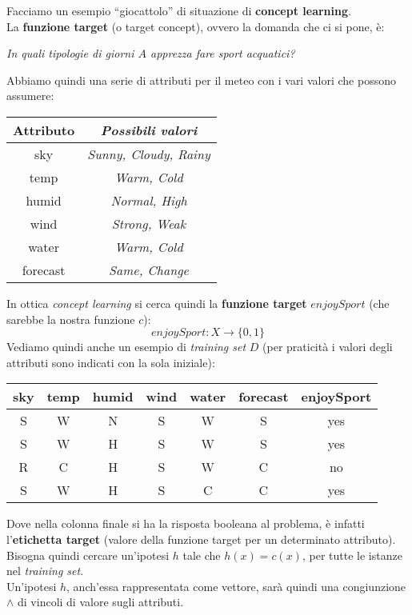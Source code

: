 \begin{esempio}
  Facciamo un esempio ``giocattolo'' di situazione di \textbf{concept
    learning}.\\ 
  La \textbf{funzione target} (o target concept), ovvero la domanda che ci si pone, è:\\
  \begin{center}
    \textit{In quali tipologie di giorni $A$ apprezza fare sport acquatici?}
  \end{center}
  Abbiamo quindi una serie di attributi per il meteo con i vari valori che
  possono assumere:
  \begin{table}[H]
    \centering
    \begin{tabular}[H]{|c|c|}
      \hline
      \textbf{Attributo} & \textbf{\textit{Possibili valori}}\\
      \hline
      sky & \textit{Sunny, Cloudy, Rainy}\\
      temp & \textit{Warm, Cold}\\
      humid & \textit{Normal, High}\\
      wind & \textit{Strong, Weak}\\
      water & \textit{Warm, Cold}\\
      forecast & \textit{Same, Change}\\
      \hline
    \end{tabular}
  \end{table}
  In ottica \textit{concept learning} si cerca quindi la \textbf{funzione
    target} $enjoySport$ (che sarebbe la nostra funzione $c$): 
  \[enjoySport:X\to\{0,1\}\]
  Vediamo quindi anche un esempio di \textit{training set} $D$ (per praticità i
  valori degli attributi sono indicati con la sola iniziale):
  \begin{table}[H]
    \centering
    \begin{tabular}[H]{|c|c|c|c|c|c|c|}
      \hline
      \textbf{sky} & \textbf{temp} & \textbf{humid} & \textbf{wind} &         
      \textbf{water} & \textbf{forecast} & \textbf{enjoySport}\\
      \hline
      S & W & N & S & W & S & \color{darkgreen} yes\\
      S & W & H & S & W & S & \color{darkgreen} yes\\
      R & C & H & S & W & C & \color{red} no\\
      S & W & H & S & C & C & \color{darkgreen} yes\\
      \hline
    \end{tabular}
  \end{table}
  Dove nella colonna finale si ha la risposta booleana al problema, è infatti
  l'\textbf{etichetta target} (valore della funzione target per un determinato attributo).\\
  Bisogna quindi cercare un'ipotesi $h$ tale che $h(x)=c(x)$,
  per tutte le istanze nel \textit{training set}.\\
  Un'ipotesi $h$, anch'essa rappresentata come vettore, sarà quindi una
  congiunzione $\land$ di vincoli di valore sugli attributi.
  \label{es:tab}
\end{esempio}
